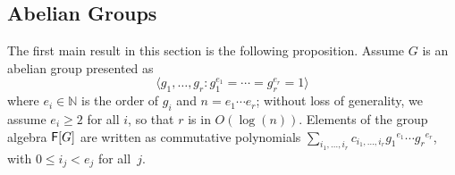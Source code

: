 

\subsection{Abelian Groups}\label{ssec:proj_abelian}

The first main result in this section is the following proposition.
Assume $G$ is an abelian group presented as 
$$ \langle g_1, \ldots , g_r: g_{1}^{e_1} = \cdots = g_{r}^{e_r} = 1
\rangle$$ where $ e_i \in \mathbb{N}$ is the order of $g_i$ and $n =
e_1 \cdots e_r$; without loss of generality, we assume $e_i \ge 2$ for
all $i$, so that $r$ is in $O(\log(n))$. Elements of the group
algebra ${\mathsf{F}}[G]$ are written as commutative polynomials
$\sum_{i_1,\dots,i_r} c_{i_1,\dots,i_r} {g_1}^{e_1} \cdots {g_r}^{e_r}$,
with $0\le i_j < e_j$ for all~$j$.


